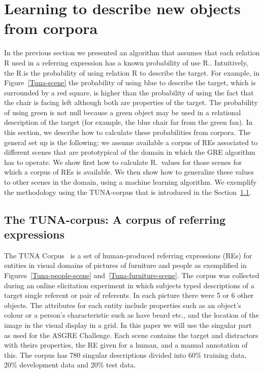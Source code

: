 \section{Learning to describe new objects from corpora}
\label{sec:learning}

In the previous section we presented an algorithm that assumes that each relation R 
used in a referring expression has a known probability of use R.\puse. 
Intuitively, the R.\puse is the probability of using relation R to describe the target. For example, in Figure~\ref{Tuna-scene} the probability of using blue to describe the target, which is surrounded by a red square, is higher than the probability of using the fact that the chair is facing left although both are properties of the target. The probability of using green is not null because a green object may be used in a relational description of the target (for example, the blue chair far from the green fan). In this section, 
we describe how to calculate these probabilities from corpora.  
The general set up is the following: we assume available a corpus of REs associated 
to different scenes that are prototypical of the domain in which the GRE algorithm has to operate.   
We show first how to calculate R.\puse\ values for those scenes for which a corpus of REs is available.  
We then show how to generalize these values to 
other scenes in the domain, using a machine learning algorithm. We exemplify the methodology using 
the TUNA-corpus that is introduced in the Section~\ref{sec:tuna}.

\subsection{The TUNA-corpus: A corpus of referring expressions}
\label{sec:tuna}
The TUNA Corpus~\cite{vanDeemter:2006:BST:1706269.1706296} is a set of human-produced referring expressions (REs) for entities in visual domains of pictures of furniture and people as exemplified in Figures~\ref{Tuna-people-scene} and~\ref{Tuna-furniture-scene}. The corpus was
collected during an online elicitation experiment in which subjects typed descriptions of a target single referent or pair of referents. 
In each picture there were 5 or 6 other objects. 
The attributes for each entity include properties such as an object's colour or a person's characteristic such as have beard etc., and the location of the image in the visual display in a grid.
In this paper we will use the singular part as used for the ASGRE Challenge. Each scene contains the target and distractors with theirs properties, the RE given for a human, and a manual annotation of this.   
The corpus has 780 singular descriptions divided
into 60\% training data, 20\% development data and
20\% test data. 


